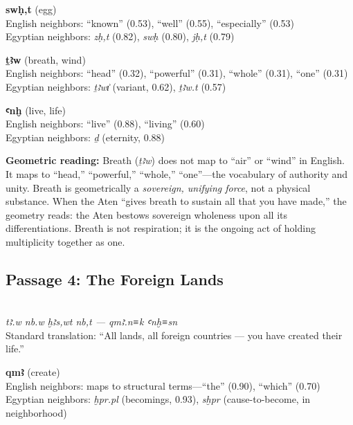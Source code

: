 \documentclass[11pt, a4paper]{article}
\newcommand{\passagehiero}[1]{{\normalfont\hierofont\fontsize{14}{17}\selectfont #1}}
\begin{document}
\noindent\textbf{swḥ,t} (egg)\\
English neighbors: ``known'' (0.53), ``well'' (0.55), ``especially'' (0.53)\\
Egyptian neighbors: \textit{zḥ,t} (0.82), \textit{swḥ} (0.80), \textit{jḥ,t} (0.79)

\medskip

\noindent\textbf{ṯꜣw} (breath, wind)\\
English neighbors: ``head'' (0.32), ``powerful'' (0.31), ``whole'' (0.31), ``one'' (0.31)\\
Egyptian neighbors: \textit{ṯꜣwı͗} (variant, 0.62), \textit{ṯꜣw.t} (0.57)

\medskip

\noindent\textbf{ꜥnḫ} (live, life)\\
English neighbors: ``live'' (0.88), ``living'' (0.60)\\
Egyptian neighbors: \textit{ḏ} (eternity, 0.88)

\medskip

{\color{insight}\textbf{Geometric reading:}} Breath (\textit{ṯꜣw}) does not map to ``air'' or ``wind'' in English. It maps to ``head,'' ``powerful,'' ``whole,'' ``one''---the vocabulary of authority and unity. Breath is geometrically a \textit{sovereign, unifying force}, not a physical substance. When the Aten ``gives breath to sustain all that you have made,'' the geometry reads: the Aten bestows sovereign wholeness upon all its differentiations. Breath is not respiration; it is the ongoing act of holding multiplicity together as one.

\subsection{Passage 4: The Foreign Lands}

{\color{passage}\passagehiero{𓇾𓇾𓇾 𓎟𓅱 𓈉𓏏𓏥 𓎟𓏏 --- 𓌙𓅓𓄿𓈖𓎡 𓋹𓊃𓈖}\\\medskip
\textit{\small tꜣ.w nb.w ḫꜣs,wt nb,t --- qmꜣ.n≡k ꜥnḫ≡sn}\\
Standard translation: ``All lands, all foreign countries --- you have created their life.''}

\bigskip

\noindent\textbf{qmꜣ} (create)\\
English neighbors: maps to structural terms---``the'' (0.90), ``which'' (0.70)\\
Egyptian neighbors: \textit{ḫpr.pl} (becomings, 0.93), \textit{sḫpr} (cause-to-become, in neighborhood)
\end{document}
